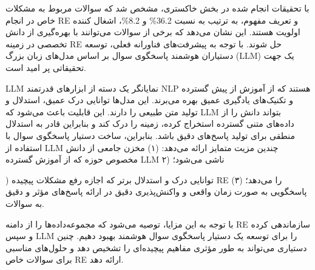 \documentclass[a4paper,10pt]{article}
\begin{document}
            با تحقیقات انجام شده در بخش خاکستری، مشخص شد که سوالات مربوط به مشکلات خاص در انجام RE و تعریف مفهوم، به ترتیب به نسبت 36.2\% و 8.2\%، اشغال کننده اولویت هستند. این نشان می‌دهد که برخی از سوالات می‌توانند با بهره‌گیری از دانش تخصصی در زمینه RE حل شوند. با توجه به پیشرفت‌های فناورانه فعلی، توسعه دستیاران هوشمند پاسخگوی سوال بر اساس مدل‌های زبان بزرگ (LLM) یک جهت تحقیقاتی پر امید است.

            LLM نمایانگر یک دسته از ابزارهای قدرتمند NLP هستند که از آموزش از پیش گسترده و تکنیک‌های یادگیری عمیق بهره می‌برند. این مدل‌ها توانایی درک عمیق، استدلال و تولید متن طبیعی را دارند. این قابلیت باعث می‌شود که LLM بتواند دانش را از داده‌های متنی گسترده استخراج کرده، زمینه را درک کند و بنابراین قادر به استدلال منطقی برای تولید پاسخ‌های دقیق باشد. بنابراین، ساخت دستیار پاسخگوی سوال با استفاده از LLM چندین مزیت متمایز ارائه می‌دهد: (۱) مخزن جامعی از دانش مخصوص حوزه که از آموزش گسترده LLM ناشی می‌شود؛ (۲

            ) توانایی درک و استدلال برتر که اجازه رفع مشکلات پیچیده RE را می‌دهد؛ (۳) پاسخگویی به صورت زمان واقعی و واکنش‌پذیری دقیق در ارائه پاسخ‌های مؤثر و دقیق به سوالات.

            با توجه به این مزایا، توصیه می‌شود که مجموعه‌داده‌ها را از دامنه RE سازماندهی کرده و سپس LLM را برای توسعه یک دستیار پاسخگوی سوال هوشمند بهبود دهیم. چنین دستیاری می‌تواند به طور مؤثری مفاهیم پیچیده‌ای را تشخیص دهد و حلول‌های مناسبی برای سوالات خاص RE ارائه دهد.
\end{document}
